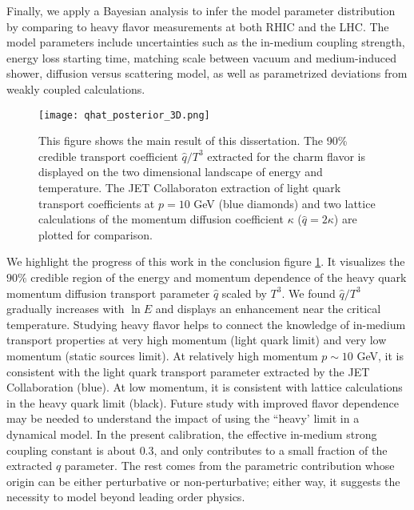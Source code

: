 Finally, we apply a Bayesian analysis to infer the model parameter distribution by comparing to heavy flavor measurements at both RHIC and the LHC.
The model parameters include uncertainties such as the in-medium coupling strength, energy loss starting time, matching scale between vacuum and medium-induced shower, diffusion versus scattering model, as well as parametrized deviations from weakly coupled calculations.

\begin{figure}
\centering
\texttt{[image: qhat\_posterior\_3D.png]}
\caption{This figure shows the main result of this dissertation. The 90\% credible transport coefficient $\hat{q}/T^3$ extracted for the charm flavor is displayed on the two dimensional landscape of energy and temperature. The JET Collaboraton extraction of light quark transport coefficients at $p=10$ GeV \cite{Burke:2013yra} (blue diamonds) and two lattice calculations of the momentum diffusion coefficient $\kappa$ ($\hat{q}=2\kappa$) \cite{Ding:2012sp,Banerjee:2011ra} are plotted for comparison.}
\label{fig:conlusion}
\end{figure}

We highlight the progress of this work in the conclusion figure \ref{fig:conlusion}.
It visualizes the $90\%$ credible region of the energy and momentum dependence of the heavy quark momentum diffusion transport parameter $\hat{q}$ scaled by $T^3$.
We found $\hat{q}/T^3$ gradually increases with $\ln E$ and displays an enhancement near the critical temperature.
Studying heavy flavor helps to connect the knowledge of in-medium transport properties at very high momentum (light quark limit) and very low momentum (static sources limit).
At relatively high momentum $p\sim 10$ GeV, it is consistent with the light quark transport parameter extracted by the JET Collaboration (blue).
At low momentum, it is consistent with lattice calculations in the heavy quark limit (black).
Future study with improved flavor dependence may be needed to understand the impact of using the ``heavy' limit in a dynamical model.
In the present calibration, the effective in-medium strong coupling constant is about $0.3$, and only contributes to a small fraction of the extracted $\hat{q}$ parameter.
The rest comes from the parametric contribution whose origin can be either perturbative or non-perturbative; either way, it suggests the necessity to model beyond leading order physics.

